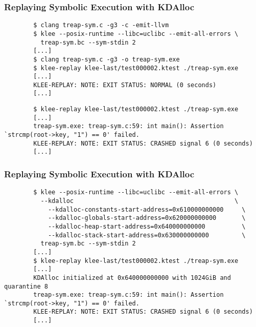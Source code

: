 \documentclass{beamer}
\begin{document}
\begin{frame}[fragile]
	\frametitle{Replaying Symbolic Execution with KDAlloc}
	\begin{verbatim}
		$ clang treap-sym.c -g3 -c -emit-llvm
		$ klee --posix-runtime --libc=uclibc --emit-all-errors \
		  treap-sym.bc --sym-stdin 2
		[...]
		$ clang treap-sym.c -g3 -o treap-sym.exe
		$ klee-replay klee-last/test000002.ktest ./treap-sym.exe
		[...]
		KLEE-REPLAY: NOTE: EXIT STATUS: NORMAL (0 seconds)
		[...]
	\end{verbatim}
	\pause
	\begin{verbatim}
		$ klee-replay klee-last/test000002.ktest ./treap-sym.exe
		[...]
		treap-sym.exe: treap-sym.c:59: int main(): Assertion `strcmp(root->key, "1") == 0' failed.
		KLEE-REPLAY: NOTE: EXIT STATUS: CRASHED signal 6 (0 seconds)
		[...]
	\end{verbatim}
\end{frame}

\begin{frame}[fragile]
	\frametitle{Replaying Symbolic Execution with KDAlloc}
	\begin{verbatim}
		$ klee --posix-runtime --libc=uclibc --emit-all-errors \
		  --kdalloc                                            \
			--kdalloc-constants-start-address=0x610000000000     \
			--kdalloc-globals-start-address=0x620000000000       \
			--kdalloc-heap-start-address=0x640000000000          \
			--kdalloc-stack-start-address=0x630000000000         \
		  treap-sym.bc --sym-stdin 2
		[...]
		$ klee-replay klee-last/test000002.ktest ./treap-sym.exe
		[...]
		KDAlloc initialized at 0x640000000000 with 1024GiB and quarantine 8
		treap-sym.exe: treap-sym.c:59: int main(): Assertion `strcmp(root->key, "1") == 0' failed.
		KLEE-REPLAY: NOTE: EXIT STATUS: CRASHED signal 6 (0 seconds)
		[...]
	\end{verbatim}
\end{frame}
\end{document}
